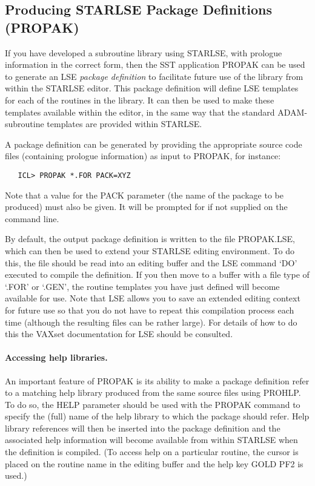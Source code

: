 \documentclass[twoside,11pt]{article}
\renewcommand{\_}{\texttt{\symbol{95}}}
\begin{document}
\subsection{Producing STARLSE Package Definitions (PROPAK)}
\label{sect:propak}

If you have developed a subroutine library using STARLSE, with prologue
information in the correct form, then the SST application PROPAK can be used
to generate an LSE {\em package definition} to facilitate future use of the
library from within the STARLSE editor.
This package definition will define LSE templates for each of the routines
in the library.
It can then be used to make these templates available within the editor, in
the same way that the standard ADAM-subroutine templates are provided within
STARLSE.

A package definition can be generated by providing the appropriate source
code files (containing prologue information) as input to PROPAK, for
instance:

\begin{verbatim}
   ICL> PROPAK *.FOR PACK=XYZ
\end{verbatim}

Note that a value for the PACK parameter (the name of the package to be
produced) must also be given.
It will be prompted for if not supplied on the command line.

By default, the output package definition is written to the file PROPAK.LSE,
which can then be used to extend your STARLSE editing environment.
To do this, the file should be read into an editing buffer and the LSE
command `DO' executed to compile the definition.
If you then move to a buffer with a file type of `.FOR' or `.GEN', the
routine templates you have just defined will become available for use.
Note that LSE allows you to save an extended editing context for future use
so that you do not have to repeat this compilation process each time
(although the resulting files can be rather large).
For details of how to do this the VAXset documentation for LSE should be
consulted.

\paragraph{Accessing help libraries.}
An important feature of PROPAK is its ability to make a package definition
refer to a matching help library produced from the same source files using
PROHLP.
To do so, the HELP parameter should be used with the PROPAK command to
specify the (full) name of the help library to which the package should
refer.
Help library references will then be inserted into the package definition
and the associated help information will become available from within
STARLSE when the definition is compiled.
(To access help on a particular routine, the cursor is placed on the routine
name in the editing buffer and the help key GOLD PF2 is used.)
\end{document}
